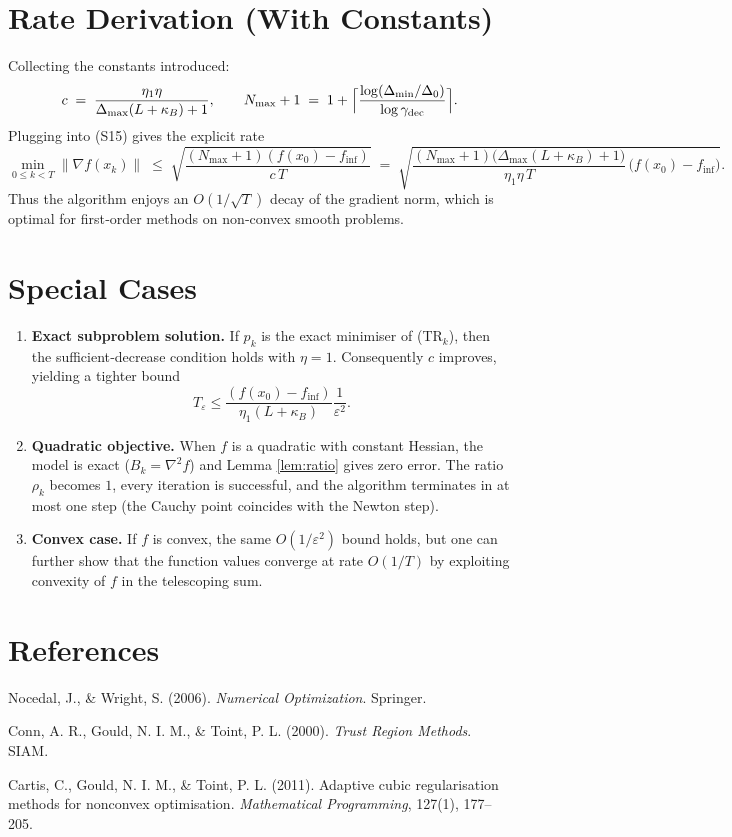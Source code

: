 \documentclass[11pt]{article}
\newcommand{\norm}[1]{\left\lVert#1\right\rVert}
\begin{document}
\section*{Rate Derivation (With Constants)}
Collecting the constants introduced:
\[
c \;=\; \frac{\eta_1\eta}{\Delta_{\max}(L+\kappa_B)+1},
\qquad
N_{\max}+1 \;=\; 1+\Bigl\lceil\frac{\log(\Delta_{\min}/\Delta_{0})}{\log\gamma_{\text{dec}}}\Bigr\rceil .
\]
Plugging into (S15) gives the explicit rate
\[
\min_{0\le k<T}\norm{\nabla f(x_k)}\;\le\;
\sqrt{\frac{(N_{\max}+1)(f(x_0)-f_{\inf})}{c\,T}}
\;=\;
\sqrt{\frac{(N_{\max}+1)\bigl(\Delta_{\max}(L+\kappa_B)+1\bigr)}{\eta_1\eta\,T}\,\bigl(f(x_0)-f_{\inf}\bigr)} .
\]
Thus the algorithm enjoys an $O(1/\sqrt{T})$ decay of the gradient norm, which is optimal for first‑order methods on non‑convex smooth problems.

\section*{Special Cases}
\begin{enumerate}[label=\alph*.,leftmargin=*,itemsep=0.3em]
\item \textbf{Exact subproblem solution.} If $p_k$ is the exact minimiser of (TR$_k$), then the sufficient‑decrease condition holds with $\eta=1$. Consequently $c$ improves, yielding a tighter bound
\[
T_{\varepsilon}\le \frac{(f(x_0)-f_{\inf})}{\eta_1 (L+\kappa_B)}\frac{1}{\varepsilon^{2}} .
\]
\item \textbf{Quadratic objective.} When $f$ is a quadratic with constant Hessian, the model is exact ($B_k=\nabla^{2}f$) and Lemma \ref{lem:ratio} gives zero error. The ratio $\rho_k$ becomes $1$, every iteration is successful, and the algorithm terminates in at most one step (the Cauchy point coincides with the Newton step).
\item \textbf{Convex case.} If $f$ is convex, the same $O(1/\varepsilon^{2})$ bound holds, but one can further show that the function values converge at rate $O(1/T)$ by exploiting convexity of $f$ in the telescoping sum.
\end{enumerate}

\section*{References}
\begin{enumerate}[label={[\arabic*]}]
\item Nocedal, J., \& Wright, S. (2006). \emph{Numerical Optimization}. Springer.
\item Conn, A. R., Gould, N. I. M., \& Toint, P. L. (2000). \emph{Trust Region Methods}. SIAM.
\item Cartis, C., Gould, N. I. M., \& Toint, P. L. (2011). Adaptive cubic regularisation methods for nonconvex optimisation. \emph{Mathematical Programming}, 127(1), 177–205.
\end{enumerate}
\end{document}
